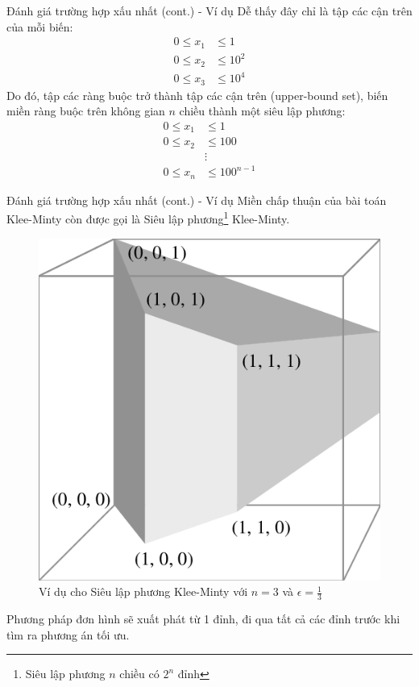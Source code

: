 \documentclass[10pt]{beamer}
\begin{document}
\begin{frame}{Đánh giá trường hợp xấu nhất (cont.) - Ví dụ}
Dễ thấy đây chỉ là tập các cận trên của mỗi biến:
$$
\begin{array}{lll}
0 \leq x_1 &\leq 1\\
0 \leq x_2 &\leq 10^2\\
0 \leq x_3 &\leq 10^4
\end{array}
$$
Do đó, tập các ràng buộc trở thành tập các cận trên (upper-bound set), biến miền ràng buộc trên không gian $n$ chiều thành một siêu lập phương:
$$
\begin{array}{lll}
0 \leq x_1 &\leq 1\\
0 \leq x_2 &\leq 100\\
&\vdots\\
0 \leq x_n &\leq 100^{n - 1}
\end{array}
$$
\end{frame}

\begin{frame}{Đánh giá trường hợp xấu nhất (cont.) - Ví dụ}
Miền chấp thuận của bài toán Klee-Minty còn được gọi là Siêu lập phương\footnote{Siêu lập phương $n$ chiều có $2^n$ đỉnh\cite{10945-3852}} Klee-Minty.
\begin{figure}
\includegraphics[scale=.15]{img/klee-minty-cube.png}
\caption{Ví dụ cho Siêu lập phương Klee-Minty với $n = 3$ và $\epsilon = \frac{1}{3}$}
\end{figure}
Phương pháp đơn hình sẽ xuất phát từ 1 đỉnh, đi qua tất cả các đỉnh trước khi tìm ra phương án tối ưu.
\end{frame}
\end{document}
